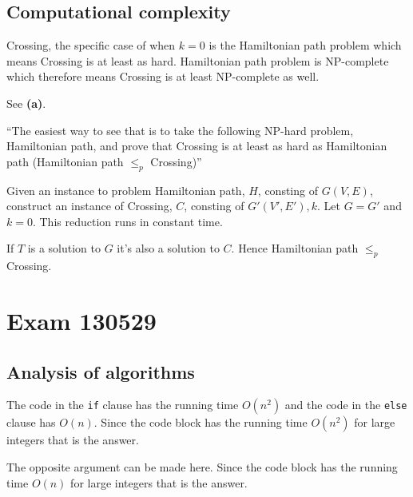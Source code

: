 \documentclass[a4paper]{article}
\newenvironment{task}[1]
{
	\begin{description}[align=right]
		\item [#1]
}{		%
	\end{description}
}
\newcommand{\taskref}[1]{\textbf{#1}}
\DeclareMathOperator{\*}{\cdot}
\begin{document}
\subsection*{Computational complexity}

\begin{task}{6. (a)}
	 Crossing, the specific case of when $k=0$ is the Hamiltonian path problem which means Crossing is at least as hard. Hamiltonian path problem is NP-complete which therefore means Crossing is at least NP-complete as well.
\end{task}

\begin{task}{(b)}
	 See \taskref{(a)}.
\end{task}

\begin{task}{(c)}
	 ``The easiest way to see that is to take the following NP-hard problem, Hamiltonian path, and prove that Crossing is at least as hard as Hamiltonian path (Hamiltonian path $\leq_p$ Crossing)''
\end{task}

\begin{task}{(d)}
	\qquad Given an instance to problem Hamiltonian path, $H$, consting of $G(V,E)$, construct an instance of Crossing, $C$, consting of $G'(V',E'), k$. Let $G=G'$ and $k=0$. This reduction runs in constant time.
	
	If $T$ is a solution to $G$ it's also a solution to $C$. Hence Hamiltonian path $\leq_p$ Crossing.
\end{task}

\pagebreak
\section*{Exam 130529}
\subsection*{Analysis of algorithms}

\begin{task}{1. (a)}
	 The code in the \texttt{if} clause has the running time $O(n^2)$ and the code in the \texttt{else} clause has $O(n)$. Since the code block has the running time $O(n^2)$ for large integers that is the answer.
\end{task}

\begin{task}{2. (a)}
	 The opposite argument can be made here. Since the code block has the running time $O(n)$ for large integers that is the answer.
\end{task}
\end{document}
